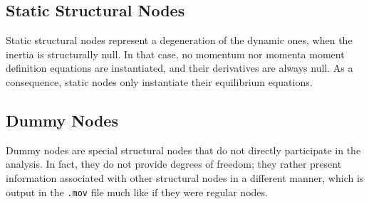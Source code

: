 \documentclass[10pt,fleqn,subeqn]{report}
\newcommand{\T}[1]{\bm{#1}}
\newcommand{\TT}[1]{\bm{#1}}
\begin{document}

\subsection{Static Structural Nodes}
\label{sec:nodes:structural nodes:static structural nodes}
Static structural nodes represent a degeneration of the dynamic ones,
when the inertia is structurally null.
In that case, no momentum nor momenta moment definition equations
are instantiated, and their derivatives are always null.
As a consequence, static nodes only instantiate their equilibrium equations.

\subsection{Dummy Nodes}
\label{sec:nodes:structural nodes:dummy nodes}
Dummy nodes are special structural nodes that do not directly 
participate in the analysis.
In fact, they do not provide degrees of freedom; they rather
present information associated with other structural nodes 
in a different manner, which is output in the \texttt{.mov}
file much like if they were regular nodes.
\end{document}
